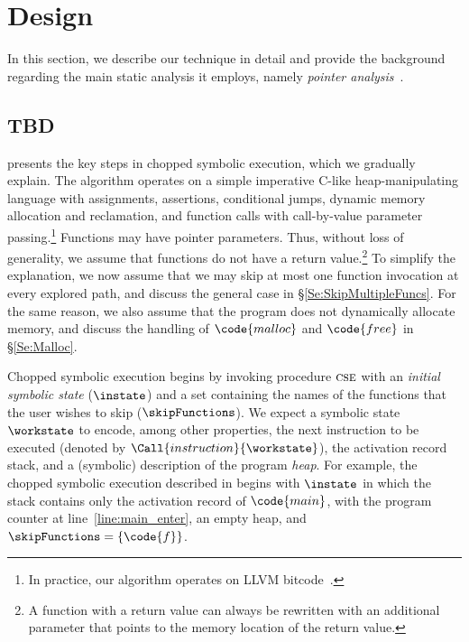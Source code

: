 

\chapter{Design}\label{chapter:design}

In this section, we describe our technique in detail and provide the
background regarding the main static analysis it employs, namely
\emph{pointer analysis}~\cite{andersen:pointeranalysis,
  Hind:Paste2001, Smaragdakis:FTPL2015}.

\section{TBD}



 presents the key steps in chopped
symbolic execution, which we gradually explain. The algorithm operates
on a simple imperative C-like heap-manipulating language with
assignments, assertions, conditional jumps, dynamic memory allocation
and reclamation, and function calls with call-by-value parameter
passing.\footnote{In practice, our algorithm operates on LLVM
  bitcode~\cite{llvm}.}  Functions may have pointer parameters. Thus,
without loss of generality, we assume that functions do not have a
return value.\footnote{A function with a return value can always be
  rewritten with an additional parameter that points to the memory
  location of the return value.}  To simplify the explanation, we now
assume that we may skip at most one function invocation at every
explored path, and discuss the general case in
\S\ref{Se:SkipMultipleFuncs}. For the same reason, we also assume that
the program does not dynamically allocate memory, and discuss the
handling of $\code{malloc}$ and $\code{free}$ in \S\ref{Se:Malloc}.

Chopped symbolic execution begins by invoking procedure $\textsc{cse}$
with an \emph{initial symbolic state} ($\instate$) and a set
containing the names of the functions that the user wishes to skip
($\skipFunctions$). We expect a symbolic state $\workstate$ to encode,
among other properties, the next instruction to be executed (denoted
by $\Call{instruction}{\workstate}$), the activation record stack, and
a (symbolic) description of the program \emph{heap}. For example, the
chopped symbolic execution described in  begins
with $\instate$ in which the stack contains only the activation record
of $\code{main}$, with the program counter at
line~\ref{line:main_enter}, an empty heap, and
$\skipFunctions = \{ \code{f} \}$.

